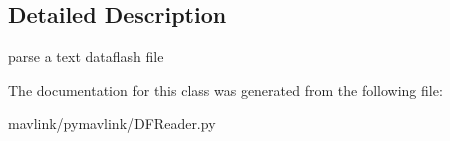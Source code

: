\subsection{Detailed Description}
\begin{DoxyVerb}parse a text dataflash file\end{DoxyVerb}
 

The documentation for this class was generated from the following file\+:\begin{DoxyCompactItemize}
\item 
mavlink/pymavlink/D\+F\+Reader.\+py\end{DoxyCompactItemize}
